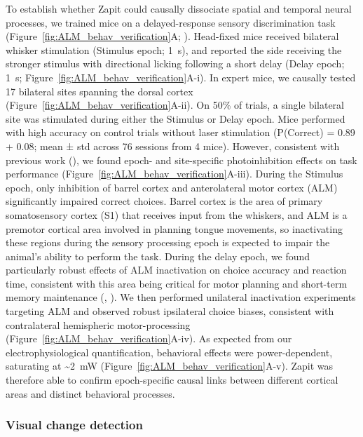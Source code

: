 To establish whether Zapit could causally dissociate spatial and temporal neural processes, we trained mice on a delayed-response sensory discrimination task (Figure~\ref{fig:ALM_behav_verification}A; \cite{Gauld2024APerception}).
Head-fixed mice received bilateral whisker stimulation (Stimulus epoch; 1~s), and reported the side receiving the stronger stimulus with directional licking following a short delay (Delay epoch; 1~s; Figure~\ref{fig:ALM_behav_verification}A-i).
In expert mice, we causally tested 17 bilateral sites spanning the dorsal cortex (Figure~\ref{fig:ALM_behav_verification}A-ii).
On 50\% of trials, a single bilateral site was stimulated during either the Stimulus or Delay epoch.
Mice performed with high accuracy on control trials without laser stimulation (P(Correct) = 0.89 + 0.08; mean ± std across 76 sessions from 4 mice).
However, consistent with previous work (\cite{Guo2014FlowMice}), we found epoch- and site-specific photoinhibition effects on task performance (Figure~\ref{fig:ALM_behav_verification}A-iii).
During the Stimulus epoch, only inhibition of barrel cortex and anterolateral motor cortex (ALM) significantly impaired correct choices.
Barrel cortex is the area of primary somatosensory cortex (S1) that receives input from the whiskers, and ALM is a premotor cortical area involved in planning tongue movements, so inactivating these regions during the sensory processing epoch is expected to impair the animal’s ability to perform the task.
During the delay epoch, we found particularly robust effects of ALM inactivation on choice accuracy and reaction time, consistent with this area being critical for motor planning and short-term memory maintenance (\cite{Guo2014FlowMice}, \cite{Li2016RobustPlanning}).
We then performed unilateral inactivation experiments targeting ALM and observed robust ipsilateral choice biases, consistent with contralateral hemispheric motor-processing (Figure~\ref{fig:ALM_behav_verification}A-iv).
As expected from our electrophysiological quantification, behavioral effects were power-dependent, saturating at \textasciitilde2~mW (Figure~\ref{fig:ALM_behav_verification}A-v).
Zapit was therefore able to confirm epoch-specific causal links between different cortical areas and distinct behavioral processes.

\subsubsection{Visual change detection}

